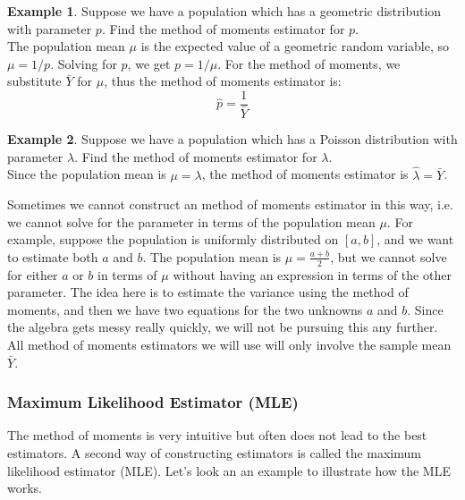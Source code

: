 \documentclass[12pt]{article}
\theoremstyle{definition}
\newtheorem*{example}{Example}
\theoremstyle{remark}
\begin{document}
\begin{example}Suppose we have a population which has a geometric distribution with parameter $p$. Find the method of moments estimator for $p$.\\

The population mean $\mu$ is the expected value of a geometric random variable, so $\mu = 1 / p$. Solving for $p$, we get $p = 1 / \mu$. For the method of moments, we substitute $\bar{Y}$ for $\mu$, thus the method of moments estimator is:
\[
\hat{p} = \frac{1}{\bar{Y}}
\]
\end{example}

\begin{example}Suppose we have a population which has a Poisson distribution with parameter $\lambda$. Find the method of moments estimator for $\lambda$.\\

Since the population mean is $\mu = \lambda$, the method of moments estimator is $\hat{\lambda} = \bar{Y}$.
\end{example}

Sometimes we cannot construct an method of moments estimator in this way, i.e. we cannot solve for the parameter in terms of the population mean $\mu$. For example, suppose the population is uniformly distributed on $[a, b]$, and we want to estimate both $a$ and $b$. The population mean is $\mu = \frac{a + b}{2}$, but we cannot solve for either $a$ or $b$ in terms of $\mu$ without having an expression in terms of the other parameter. The idea here is to estimate the variance using the method of moments, and then we have two equations for the two unknowns $a$ and $b$. Since the algebra gets messy really quickly, we will not be pursuing this any further. All method of moments estimators we will use will only involve the sample mean $\bar{Y}$.

\subsubsection{Maximum Likelihood Estimator (MLE)}
The method of moments is very intuitive but often does not lead to the best estimators. A second way of constructing estimators is called the maximum likelihood estimator (MLE). Let's look an an example to illustrate how the MLE works.
\end{document}
